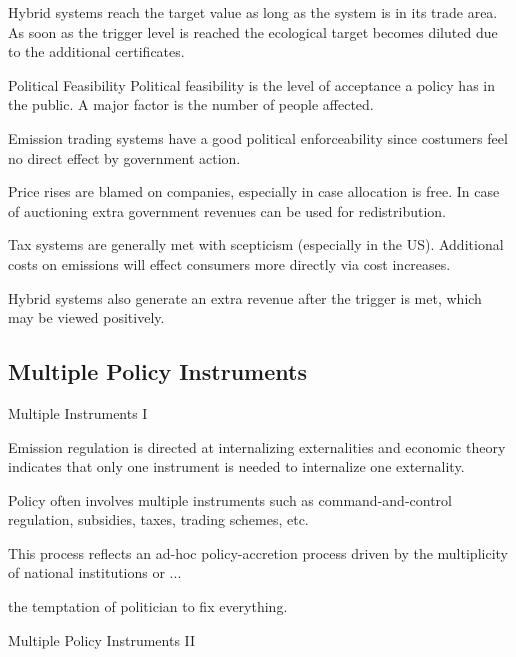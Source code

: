 	Hybrid systems reach the target value as long as the system is in its trade area. As soon as the trigger level is reached the ecological target becomes diluted due to the additional certificates.





{Political Feasibility}
Political feasibility is the level of acceptance a policy has in the public. A major factor is the number of people affected.






	Emission trading systems have a good political enforceability since costumers feel no direct effect by government action.


	Price rises are blamed on companies, especially in case allocation is free. In case of auctioning extra government revenues can be used for redistribution.


	Tax systems are generally met with scepticism (especially in the US). Additional costs on emissions will effect consumers more directly via cost increases.


	Hybrid systems also generate an extra revenue after the trigger is met, which may be viewed positively.





\subsection{Multiple Policy Instruments}

{Multiple Instruments I}






	Emission regulation is directed at internalizing externalities and economic theory indicates that only one instrument is needed to
internalize one externality.


	Policy often involves multiple instruments such as command-and-control regulation, subsidies, taxes, trading schemes, etc.


	This process reflects an ad-hoc policy-accretion process driven by the multiplicity of national institutions or ...


	the temptation of politician to fix everything.





{Multiple Policy Instruments II}


